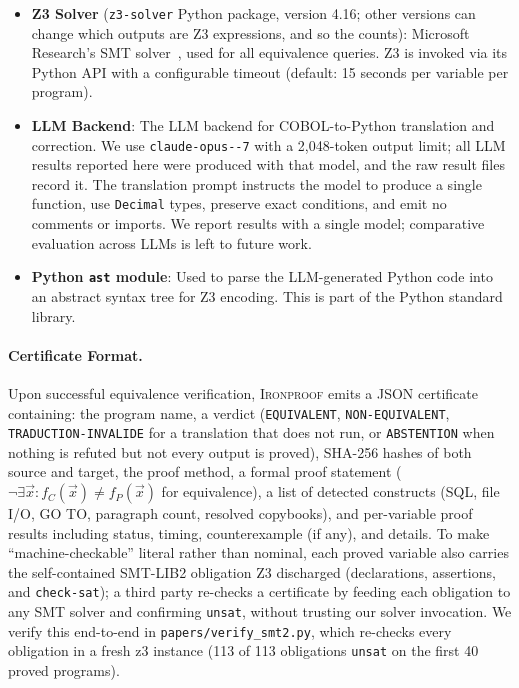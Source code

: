 \documentclass[sigconf,nonacm]{acmart}
\begin{document}
\begin{itemize}
  \item \textbf{Z3 Solver} (\texttt{z3-solver} Python package, version 4.16; other versions can change which outputs are Z3 expressions, and so the counts): Microsoft Research's SMT solver~\cite{demoura2008z3}, used for all equivalence queries. Z3 is invoked via its Python API with a configurable timeout (default: 15 seconds per variable per program).

  \item \textbf{LLM Backend}: The LLM backend for COBOL-to-Python translation and correction. We use \texttt{claude-\allowbreak opus--7} with a 2{,}048-token output limit; all LLM results reported here were produced with that model, and the raw result files record it. The translation prompt instructs the model to produce a single function, use \texttt{Decimal} types, preserve exact conditions, and emit no comments or imports. We report results with a single model; comparative evaluation across LLMs is left to future work.

  \item \textbf{Python \texttt{ast} module}: Used to parse the LLM-generated Python code into an abstract syntax tree for Z3 encoding. This is part of the Python standard library.
\end{itemize}

\paragraph{Certificate Format.} Upon successful equivalence verification, \textsc{Ironproof} emits a JSON certificate containing: the program name, a verdict (\texttt{EQUIVALENT}, \texttt{NON-\allowbreak EQUIVALENT}, \texttt{TRADUCTION-\allowbreak INVALIDE} for a translation that does not run, or \texttt{ABSTENTION} when nothing is refuted but not every output is proved), SHA-256 hashes of both source and target, the proof method, a formal proof statement ($\neg\exists \vec{x}: f_C(\vec{x}) \neq f_P(\vec{x})$ for equivalence), a list of detected constructs (SQL, file I/O, GO TO, paragraph count, resolved copybooks), and per-variable proof results including status, timing, counterexample (if any), and details. To make ``machine-checkable'' literal rather than nominal, each proved variable also carries the self-contained SMT-LIB2 obligation Z3 discharged (declarations, assertions, and \texttt{check-sat}); a third party re-checks a certificate by feeding each obligation to any SMT solver and confirming \texttt{unsat}, without trusting our solver invocation. We verify this end-to-end in \texttt{papers/verify\_smt2.py}, which re-checks every obligation in a fresh z3 instance (113 of 113 obligations \texttt{unsat} on the first 40 proved programs).
\end{document}
